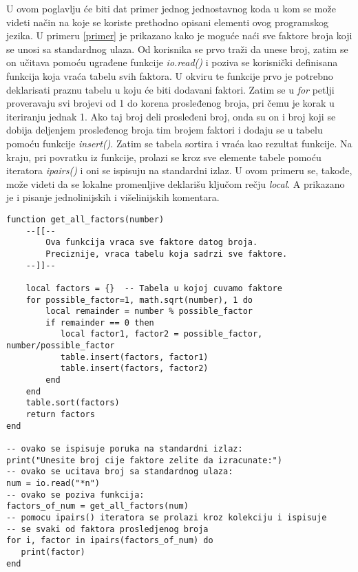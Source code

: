 \documentclass[a4paper]{article}
\begin{document}
U ovom poglavlju će biti dat primer jednog jednostavnog koda u kom se može videti način na koje se koriste prethodno opisani elementi ovog programskog jezika. U primeru \ref{primer} je prikazano kako je moguće naći sve faktore broja koji se unosi sa standardnog ulaza. Od korisnika se prvo traži da unese broj, zatim se on učitava pomoću ugrađene funkcije \textit{io.read()} i poziva se korisnički definisana funkcija koja vraća tabelu svih faktora. U okviru te funkcije prvo je potrebno deklarisati praznu tabelu u koju će biti dodavani faktori. Zatim se u \textit{for} petlji proveravaju svi brojevi od 1 do korena prosleđenog broja, pri čemu je korak u iteriranju jednak 1. Ako taj broj deli prosleđeni broj, onda su on i broj koji se dobija deljenjem prosleđenog broja tim brojem faktori i dodaju se u tabelu pomoću funkcije \textit{insert()}. Zatim se tabela sortira i vraća kao rezultat funkcije. Na kraju, pri povratku iz funkcije, prolazi se kroz sve elemente tabele pomoću iteratora \textit{ipairs()} i oni se ispisuju na standardni izlaz. U ovom primeru se, takođe, može videti da se lokalne promenljive deklarišu ključom rečju \textit{local}. A prikazano je i pisanje jednolinijskih i višelinijskih komentara.

\begin{lstlisting}[caption={Primer izračunavanja faktora broja},frame=single, label=primer]
function get_all_factors(number)
    --[[--
    	Ova funkcija vraca sve faktore datog broja.
    	Preciznije, vraca tabelu koja sadrzi sve faktore.
    --]]--
    
    local factors = {}  -- Tabela u kojoj cuvamo faktore
    for possible_factor=1, math.sqrt(number), 1 do
        local remainder = number % possible_factor        
        if remainder == 0 then
           local factor1, factor2 = possible_factor, number/possible_factor
           table.insert(factors, factor1)
           table.insert(factors, factor2) 
        end
    end
    table.sort(factors)
    return factors
end

-- ovako se ispisuje poruka na standardni izlaz:
print("Unesite broj cije faktore zelite da izracunate:")
-- ovako se ucitava broj sa standardnog ulaza:
num = io.read("*n")
-- ovako se poziva funkcija:
factors_of_num = get_all_factors(num)
-- pomocu ipairs() iteratora se prolazi kroz kolekciju i ispisuje 
-- se svaki od faktora prosledjenog broja
for i, factor in ipairs(factors_of_num) do
   print(factor) 
end
\end{lstlisting}

\end{document}
